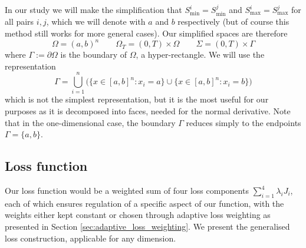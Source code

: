In our study we will make the simplification that $S_\text{min}^i = S_\text{min}^j$ and $S_\text{max}^i = S_\text{max}^j$ for all pairs $i, j$, which we will denote with $a$ and $b$ respectively (but of course this method still works for more general cases). Our simplified spaces are therefore
\begin{equation}
    \Omega = (a, b)^n \qquad \Omega_T = (0, T) \times \Omega \qquad \Sigma = (0, T) \times \Gamma
\end{equation}
where $\Gamma := \partial \Omega$ is the boundary of $\Omega$, a hyper-rectangle. We will use the representation
\begin{equation}
    \Gamma = \bigcup_{i=1}^n \big(\{x \in [a, b]^n : x_i = a\} \cup \{x \in [a, b]^n : x_i = b\} \big)
\end{equation}
which is not the simplest representation, but it is the most useful for our purposes as it is decomposed into faces, needed for the normal derivative. Note that in the one-dimensional case, the boundary $\Gamma$ reduces simply to the endpoints $\Gamma = \{a, b\}$.

\subsection{Loss function}
Our loss function would be a weighted sum of four loss components $\sum_{i=1}^4 \lambda_iJ_i$, each of which ensures regulation of a specific aspect of our function, with the weights either kept constant or chosen through adaptive loss weighting as presented in Section \ref{sec:adaptive_loss_weighting}. We present the generalised loss construction, applicable for any dimension.

